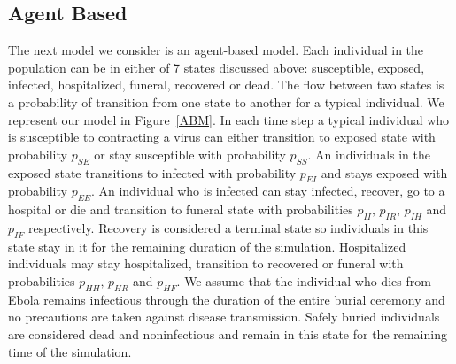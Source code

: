 \documentclass[10pt]{article}
\begin{document}
%
%
% 
%        
%  
%       
%
%
%
%        
%
%
\subsection{Agent Based} 
The next model we consider is an agent-based model. Each individual in the population can be in either of 7 states discussed above: susceptible, exposed, infected, hospitalized, funeral, recovered or dead. The flow between two states is a  probability of transition from one state to another for a typical individual. We represent our model in Figure~\ref{ABM}. In each time step a typical individual who is susceptible to contracting a virus can either transition to exposed state with probability $p_{SE}$ or stay susceptible with probability $p_{SS}$. An individuals in the exposed state transitions to infected with probability $p_{EI}$ and stays exposed with probability $p_{EE}$. An individual who is infected can stay infected, recover, go to a hospital or die and transition to funeral state with probabilities $p_{II},\, p_{IR},\, p_{IH}$ and $p_{IF}$ respectively. Recovery is considered a terminal state so individuals in this state stay in it for the remaining duration of the simulation. Hospitalized individuals may stay hospitalized, transition to recovered or funeral with probabilities $p_{HH}, \, p_{HR}$ and $p_{HF}$. We assume that the individual who dies from Ebola remains infectious through the duration of the entire burial ceremony and no precautions are taken against disease transmission. Safely buried individuals are considered dead and noninfectious and remain in this state for the remaining time of the simulation.  
\end{document}
